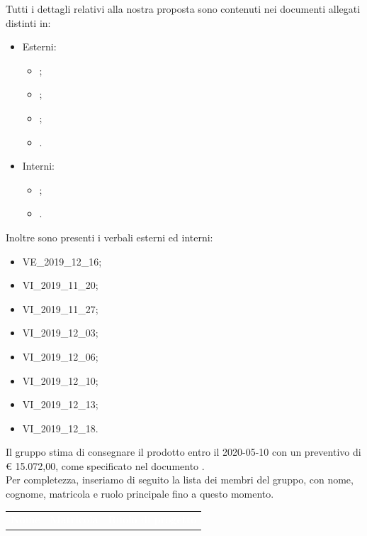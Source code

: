 \documentclass[12pt]{letter}
\begin{document}
\begin{letter}
        Tutti i dettagli relativi alla nostra proposta sono contenuti nei documenti allegati distinti in:
        \begin{itemize}
            \item Esterni:
            \begin{itemize}
                \item {};
                \item {};
                \item {};
                \item {}.
            \end{itemize}
            \item Interni:
            \begin{itemize}
                \item {};
                \item {}.
            \end{itemize}
        \end{itemize}
        Inoltre sono presenti i verbali esterni ed interni:
        \begin{itemize}
            \item VE\_2019\_12\_16;
            \item VI\_2019\_11\_20;
            \item VI\_2019\_11\_27;
            \item VI\_2019\_12\_03;
            \item VI\_2019\_12\_06;
            \item VI\_2019\_12\_10;
            \item VI\_2019\_12\_13;
            \item VI\_2019\_12\_18.
        \end{itemize}
        Il gruppo stima di consegnare il prodotto entro il 2020-05-10 con un preventivo di \euro{} 15.072,00, come specificato nel documento \PdP{}.\\
        Per completezza, inseriamo di seguito la lista dei membri del gruppo, con nome, cognome, matricola e ruolo principale fino a questo momento.
        {
            \renewcommand{\arraystretch}{2}
            \begin{longtable}{ C{4cm} C{3cm} C{6cm} }
                \textcolor{white}{\textbf{Nome}} & \textcolor{white}{\textbf{Matricola}} & \textcolor{white}{\textbf{Ruolo di progetto}}\\

\end{longtable}}
\end{letter}
\end{document}
